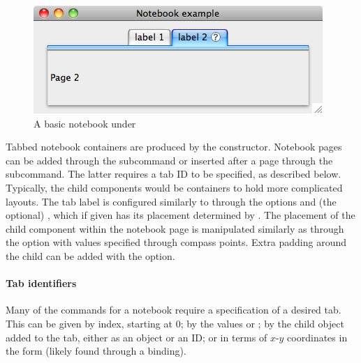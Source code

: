 
%
\begin{figure}
  \centering
  \includegraphics[width=.6\textwidth]{fig-tcltk-notebook}
 \caption{A basic notebook under \OSX{}}
  \label{fig:fig-notebook-example}
\end{figure}

Tabbed notebook containers are produced by the
 constructor.  Notebook pages can be added
through the  subcommand or inserted after
a page through the  subcommand. The
latter requires a tab ID to be specified, as described below.
Typically, the child components would be containers to hold more
complicated layouts. The tab label is configured similarly to
 through the options  and
(the optional) , which if given has its
placement determined by .  The placement
of the child component within the notebook page is manipulated
similarly as  through the
 option with values specified through
compass points. Extra padding around the child can be added with the
 option.

\paragraph{Tab identifiers} %
Many of the commands for a notebook require a specification of a
desired tab. This can be given by index, starting at 0; by the values
 or ; by the child object added to the
tab, either as an \R\/ object or an ID; or in terms of $x$-$y$
coordinates in the form  (likely found through a
binding).

